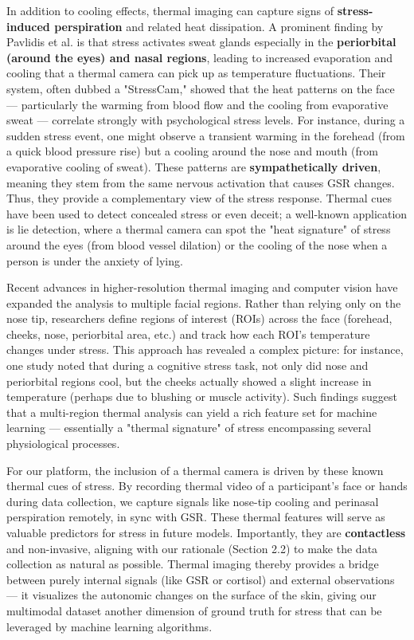 In addition to cooling effects, thermal imaging can capture signs of
\textbf{stress-induced perspiration} and related heat dissipation. A
prominent finding by Pavlidis et al. is that stress activates sweat
glands especially in the \textbf{periorbital (around the eyes) and nasal
regions}, leading to increased evaporation and cooling that a thermal
camera can pick up as temperature
fluctuations\cite{DriverStressThermal2020}.
Their system, often dubbed a "StressCam," showed that the heat patterns
on the face --- particularly the warming from blood flow and the cooling
from evaporative sweat --- correlate strongly with psychological stress
levels\cite{DriverStressThermal2020}.
For instance, during a sudden stress event, one might observe a
transient warming in the forehead (from a quick blood pressure rise) but
a cooling around the nose and mouth (from evaporative cooling of sweat).
These patterns are \textbf{sympathetically driven}, meaning they stem from
the same nervous activation that causes GSR
changes\cite{DriverStressThermal2020}.
Thus, they provide a complementary view of the stress response. Thermal
cues have been used to detect concealed stress or even deceit; a
well-known application is lie detection, where a thermal camera can spot
the "heat signature" of stress around the eyes (from blood vessel
dilation) or the cooling of the nose when a person is under the anxiety
of lying.

Recent advances in higher-resolution thermal imaging and computer vision
have expanded the analysis to multiple facial regions. Rather than
relying only on the nose tip, researchers define regions of interest
(ROIs) across the face (forehead, cheeks, nose, periorbital area, etc.)
and track how each ROI's temperature changes under
stress\cite{ContactlessStressThermal2022}\cite{ContactlessStressThermal2022}.
This approach has revealed a complex picture: for instance, one study
noted that during a cognitive stress task, not only did nose and
periorbital regions cool, but the cheeks actually showed a slight
increase in temperature (perhaps due to blushing or muscle
activity)\cite{ContactlessStressThermal2022}.
Such findings suggest that a multi-region thermal analysis can yield a
rich feature set for machine learning --- essentially a "thermal
signature" of stress encompassing several physiological processes.

For our platform, the inclusion of a thermal camera is driven by these
known thermal cues of stress. By recording thermal video of a
participant's face or hands during data collection, we capture signals
like nose-tip cooling and perinasal perspiration remotely, in sync with
GSR. These thermal features will serve as valuable predictors for stress
in future models. Importantly, they are \textbf{contactless} and
non-invasive, aligning with our rationale (Section 2.2) to make the data
collection as natural as possible. Thermal imaging thereby provides a
bridge between purely internal signals (like GSR or cortisol) and
external observations --- it visualizes the autonomic changes on the
surface of the skin, giving our multimodal dataset another dimension of
ground truth for stress that can be leveraged by machine learning
algorithms.

